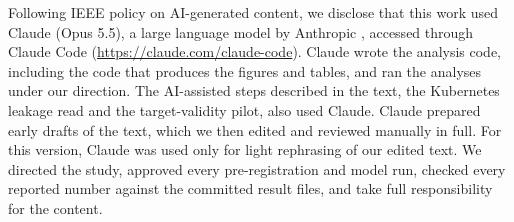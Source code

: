 Following IEEE policy on AI-generated content, we disclose that this work
used Claude (Opus 5.5), a large language model by Anthropic
\cite{anthropic2026claude}, accessed through Claude Code
(\url{https://claude.com/claude-code}). Claude wrote the analysis code,
including the code that produces the figures and tables, and ran the
analyses under our direction. The AI-assisted steps described in the text,
the Kubernetes leakage read and the target-validity pilot, also used
Claude. Claude prepared early drafts of the text, which we then edited
and reviewed manually in full. For this version, Claude was used only for light
rephrasing of our edited text. We directed the study, approved every
pre-registration and model run, checked every reported number against the
committed result files, and take full responsibility for the content.
